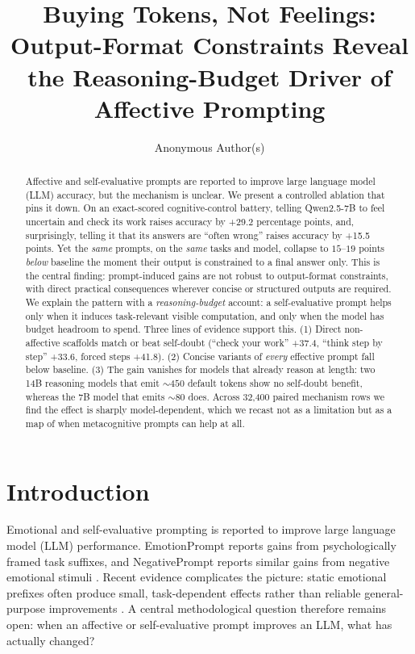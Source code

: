 \documentclass{article}
\title{Buying Tokens, Not Feelings: Output-Format Constraints Reveal the Reasoning-Budget Driver of Affective Prompting}
\author{Anonymous Author(s)}
\begin{document}
\maketitle



\begin{abstract}
Affective and self-evaluative prompts are reported to improve large language model (LLM) accuracy, but the mechanism is unclear. We present a controlled ablation that pins it down. On an exact-scored cognitive-control battery, telling Qwen2.5-7B to feel uncertain and check its work raises accuracy by +29.2 percentage points, and, surprisingly, telling it that its answers are ``often wrong'' raises accuracy by +15.5 points. Yet the \emph{same} prompts, on the \emph{same} tasks and model, collapse to $15$--$19$ points \emph{below} baseline the moment their output is constrained to a final answer only. This is the central finding: prompt-induced gains are not robust to output-format constraints, with direct practical consequences wherever concise or structured outputs are required. We explain the pattern with a \textit{reasoning-budget} account: a self-evaluative prompt helps only when it induces task-relevant visible computation, and only when the model has budget headroom to spend. Three lines of evidence support this. (1) Direct non-affective scaffolds match or beat self-doubt (``check your work'' +37.4, ``think step by step'' +33.6, forced steps +41.8). (2) Concise variants of \emph{every} effective prompt fall below baseline. (3) The gain vanishes for models that already reason at length: two 14B reasoning models that emit ${\sim}450$ default tokens show no self-doubt benefit, whereas the 7B model that emits ${\sim}80$ does. Across 32,400 paired mechanism rows we find the effect is sharply model-dependent, which we recast not as a limitation but as a map of when metacognitive prompts can help at all.
\end{abstract}

\section{Introduction}

Emotional and self-evaluative prompting is reported to improve large language model (LLM) performance. EmotionPrompt reports gains from psychologically framed task suffixes, and NegativePrompt reports similar gains from negative emotional stimuli \citep{li2023emotionprompt,wang2024negativeprompt}. Recent evidence complicates the picture: static emotional prefixes often produce small, task-dependent effects rather than reliable general-purpose improvements \citep{zhao2026emotions}. A central methodological question therefore remains open: when an affective or self-evaluative prompt improves an LLM, what has actually changed?
\end{document}
